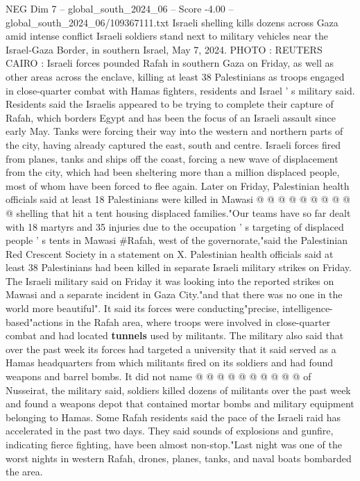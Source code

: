 \begin{textsample}{NEG Dim 7 – global\_south\_2024\_06 – Score -4.00 – global\_south\_2024\_06/109367111.txt}  \label{ex:f7_neg_370}
Israeli shelling kills dozens across Gaza amid intense conflict Israeli soldiers stand next to military vehicles near the Israel-Gaza Border, in southern Israel, May 7, 2024.
PHOTO : REUTERS CAIRO : Israeli forces pounded Rafah in southern Gaza on Friday, as well as other areas across the enclave, killing at least 38 Palestinians as troops engaged in close-quarter combat with Hamas fighters, residents and Israel ' s military said.
Residents said the Israelis appeared to be trying to complete their capture of Rafah, which borders Egypt and has been the focus of an Israeli assault since early May.
Tanks were forcing their way into the western and northern parts of the city, having already captured the east, south and centre.
Israeli forces fired from planes, tanks and ships off the coast, forcing a new wave of displacement from the city, which had been sheltering more than a million displaced people, most of whom have been forced to flee again.
Later on Friday, Palestinian health officials said at least 18 Palestinians were killed in Mawasi @ @ @ @ @ @ @ @ @ @ shelling that hit a tent housing displaced families."Our teams have so far dealt with 18 martyrs and 35 injuries due to the occupation ' s targeting of displaced people ' s tents in Mawasi \#Rafah, west of the governorate,"said the Palestinian Red Crescent Society in a statement on X.
Palestinian health officials said at least 38 Palestinians had been killed in separate Israeli military strikes on Friday.
The Israeli military said on Friday it was looking into the reported strikes on Mawasi and a separate incident in Gaza City."and that there was no one in the world more beautiful".
It said its forces were conducting"precise, intelligence-based"actions in the Rafah area, where troops were involved in close-quarter combat and had located \textbf{tunnels} used by militants.
The military also said that over the past week its forces had targeted a university that it said served as a Hamas headquarters from which militants fired on its soldiers and had found weapons and barrel bombs.
It did not name @ @ @ @ @ @ @ @ @ @ of Nusseirat, the military said, soldiers killed dozens of militants over the past week and found a weapons depot that contained mortar bombs and military equipment belonging to Hamas.
Some Rafah residents said the pace of the Israeli raid has accelerated in the past two days.
They said sounds of explosions and gunfire, indicating fierce fighting, have been almost non-stop."Last night was one of the worst nights in western Rafah, drones, planes, tanks, and naval boats bombarded the area.

\end{textsample}
